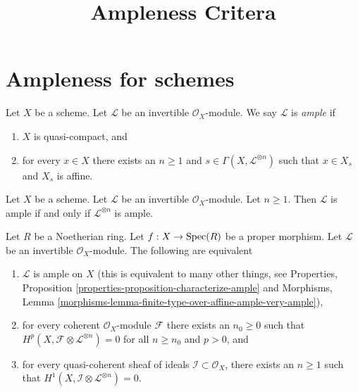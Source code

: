 


\newcommand{\todo}[1]{\footnote{\textbf{TODO.} #1}}

\title{Ampleness Critera}
\maketitle

\section{Ampleness for schemes}

\begin{definition}
\label{definition-ample}
Let $X$ be a scheme.
Let $\mathcal{L}$ be an invertible $\mathcal{O}_X$-module.
We say $\mathcal{L}$ is {\it ample} if
\begin{enumerate}
\item $X$ is quasi-compact, and
\item for every $x \in X$ there exists an $n \geq 1$
and $s \in \Gamma(X, \mathcal{L}^{\otimes n})$ such
that $x \in X_s$ and $X_s$ is affine.
\end{enumerate}
\end{definition}

\begin{lemma}
\label{lemma-ample-power-ample}
Let $X$ be a scheme. Let $\mathcal{L}$ be an invertible $\mathcal{O}_X$-module.
Let $n \geq 1$. Then $\mathcal{L}$ is ample if and only if
$\mathcal{L}^{\otimes n}$ is ample.
\end{lemma}

\begin{lemma}
\label{lemma-vanshing-gives-ample}
Let $R$ be a Noetherian ring. Let $f : X \to \mathop{\rm Spec}(R)$ be a proper morphism.
Let $\mathcal{L}$ be an invertible $\mathcal{O}_X$-module.
The following are equivalent
\begin{enumerate}
\item $\mathcal{L}$ is ample on $X$ (this is equivalent to many other
things, see
Properties, Proposition \ref{properties-proposition-characterize-ample} and
Morphisms, Lemma
\ref{morphisms-lemma-finite-type-over-affine-ample-very-ample}),
\item for every coherent $\mathcal{O}_X$-module $\mathcal{F}$ there exists
an $n_0 \geq 0$ such that
$H^p(X, \mathcal{F} \otimes \mathcal{L}^{\otimes n}) = 0$ for all $n \geq n_0$
and $p > 0$, and
\item for every quasi-coherent sheaf of ideals
$\mathcal{I} \subset \mathcal{O}_X$, there exists an $n \geq 1$
such that $H^1(X, \mathcal{I} \otimes \mathcal{L}^{\otimes n}) = 0$.
\end{enumerate}
\end{lemma}

